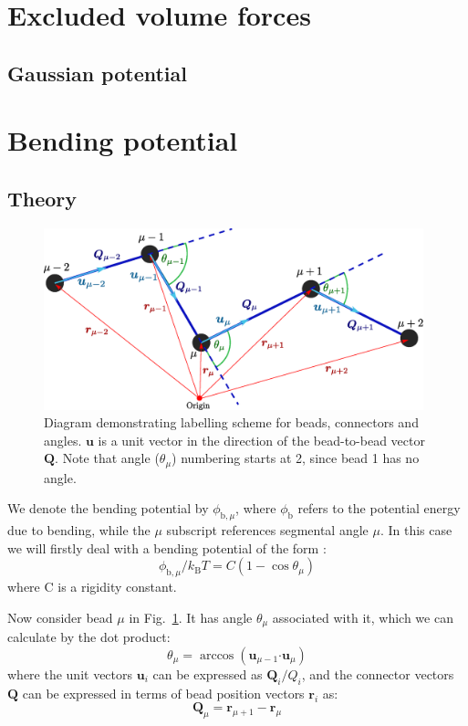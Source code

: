 \documentclass{article}
\begin{document}
\section{Excluded volume forces}

\subsection{Gaussian potential}

\section{Bending potential}

\subsection{Theory}

\begin{figure}[!ht]
    \centering
    \includegraphics[width=11cm,height=!]{bending_potential_diagram.eps}
    \caption{Diagram demonstrating labelling scheme for beads, connectors and angles. $\bm{u}$ is a unit vector in the direction of the bead-to-bead vector $\bm{Q}$. Note that angle ($\theta_\mu$) numbering starts at 2, since bead 1 has no angle.}
    \label{bending_potential_diagram}
\end{figure}

We denote the bending potential by $\phi_{\mathrm{b},\mu}$, where $\phi_\mathrm{b}$ refers to the potential energy due to bending, while the $\mu$ subscript references segmental angle $\mu$. In this case we will firstly deal with a bending potential of the form \cite{Saadat2016}:
\begin{equation}
\label{bending potential}
    \phi_{\mathrm{b},\mu}/k_\mathrm{B} T = C (1-\cos{\theta_\mu})
\end{equation}
where C is a rigidity constant. 

Now consider bead $\mu$ in Fig.~\ref{bending_potential_diagram}. It has angle $\theta_\mu$ associated with it, which we can calculate by the dot product:
\begin{equation}
\label{theta definition}
    \theta_\mu = \arccos({\bm{u}_{\mu-1} \bm{\cdot} \bm{u}_{\mu}})
\end{equation}
where the unit vectors $\bm{u}_i$ can be expressed as $\bm{Q}_i/Q_i$, and the connector vectors $\bm{Q}$ can be expressed in terms of bead position vectors $\bm{r}_i$ as:
\begin{equation}
    \bm{Q}_\mu = \bm{r}_{\mu+1} - \bm{r}_{\mu}
\end{equation}
\end{document}
